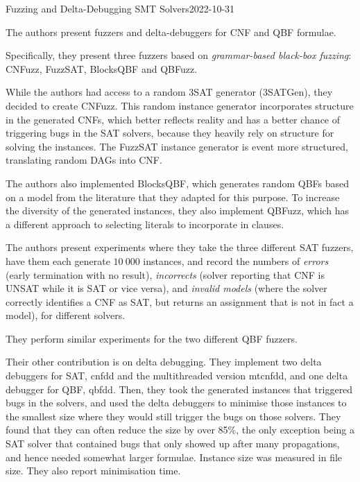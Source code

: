 \documentclass[a4paper]{tufte-handout}
\begin{document}
	\begin{papersummary}{\citep{BB09}}{Fuzzing and Delta-Debugging SMT Solvers}{2022-10-31}
		
		The authors present fuzzers and delta-debuggers for CNF and QBF formulae.
		
		Specifically, they present three fuzzers based on {\em grammar-based black-box fuzzing}: {\sf CNFuzz}, {\sf FuzzSAT}, {\sf BlocksQBF} and {\sf QBFuzz}.
		
		While the authors had access to a random 3SAT generator ({\sf 3SATGen}), they decided to create {\sf CNFuzz}.
		This random instance generator incorporates structure in the generated CNFs, which better reflects reality and has a better chance of triggering bugs in the SAT solvers, because they heavily rely on structure for solving the instances.
		The {\sf FuzzSAT} instance generator is event more structured, translating random DAGs into CNF.
		
		The authors also implemented {\sf BlocksQBF}, which generates random QBFs based on a model from the literature that they adapted for this purpose. 
		To increase the diversity of the generated instances, they also implement {\sc QBFuzz}, which has a different approach to selecting literals to incorporate in clauses.
		
		The authors present experiments where they take the three different SAT fuzzers, have them each generate $10\:000$ instances, and record the numbers of {\em errors} (early termination with no result), {\em incorrects} (solver reporting that CNF is UNSAT while it is SAT or vice versa), and {\em invalid models} (where the solver correctly identifies a CNF as SAT, but returns an assignment that is not in fact a model), for different solvers.
		
		They perform similar experiments for the two different QBF fuzzers.
		
		Their other contribution is on delta debugging.
		They implement two delta debuggers for SAT, {\sf cnfdd} and the multithreaded version {\sf mtcnfdd}, and one delta debugger for QBF, {\sf qbfdd}.
		Then, they took the generated instances that triggered bugs in the solvers, and used the delta debuggers to minimise those instances to the smallest size where they would still trigger the bugs on those solvers.
		They found that they can often reduce the size by over 85\%, the only exception being a SAT solver that contained bugs that only showed up after many propagations, and hence needed somewhat larger formulae.
		Instance size was measured in file size.
		They also report minimisation time.
		

\end{papersummary}
\end{document}
